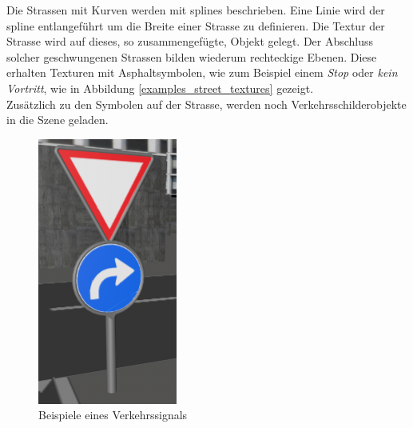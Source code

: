 Die Strassen mit Kurven werden mit \glspl{spline} beschrieben. Eine Linie wird der \gls{spline} entlangeführt um die Breite einer Strasse zu definieren. Die Textur der Strasse wird auf dieses, so zusammengefügte, Objekt gelegt. Der Abschluss solcher geschwungenen Strassen bilden wiederum rechteckige Ebenen. Diese erhalten Texturen mit Asphaltsymbolen, wie zum Beispiel einem \textit{Stop} oder \textit{kein Vortritt}, wie in Abbildung \ref{examples_street_textures} gezeigt. \\
Zusätzlich zu den Symbolen auf der Strasse, werden noch Verkehrsschilderobjekte in die Szene geladen.
\begin{figure}[H]
\centering 
\includegraphics[scale=0.6]{src/screenshot_trafficsignal.png}
\caption{Beispiele eines Verkehrssignals} %
\label{screenshot_trafficsignal} %
\end{figure}

